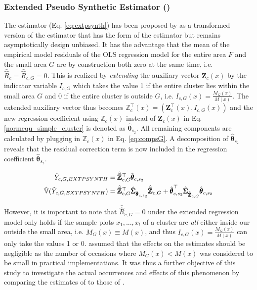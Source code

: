 \subsubsection{Extended Pseudo Synthetic Estimator (\extpsynth{})}

The \extpsynth{} estimator (Eq. \ref{eq:extpsynth}) has been proposed by \cite{mandallaz2013a} as a transformed version of the \psmall{} estimator that has the form of the \psynth{} estimator but remains asymptotically design unbiased. It has the advantage that the mean of the empirical model residuals of the OLS regression model for the entire area $F$ and the small area $G$ are by construction both zero at the same time, i.e. $\bar{\hat{R}}_{c} = \bar{\hat{R}}_{c,G} = 0$. This is realized by \textit{extending} the auxiliary vector $\pmb{Z}_{c}(x)$ by the indicator variable $I_{c,G}$ which takes the value 1 if the entire cluster lies within the small area $G$ and 0 if the entire cluster is outside $G$, i.e. $I_{c,G}(x)=\frac{M_{G}(x)}{M(x)}$. The extended auxiliary vector thus becomes $\pmb{\mathbb{Z}}_{c}^{\top}(x)= (\pmb{Z}_{c}^{\top}(x),I_{c,G}(x))$ and the new regression coefficient using $\pmb{\mathbb{Z}}_{c}(x)$ instead of $\pmb{Z}_{c}(x)$ in Eq. \ref{normequ_simple_cluster} is denoted as $\hat{\pmb{\theta}}_{s_2}$. All remaining components are calculated by plugging in $\pmb{\mathbb{Z}}_{c}(x)$ in Eq. \ref{eq:compsG}. A decomposition of $\hat{\pmb{\theta}}_{s_2}$ reveals that the residual correction term is now included in the regression coefficient $\hat{\pmb{\theta}}_{s_2}$.

\begin{subequations}\label{eq:extpsynth}
	\begin{align}
	\hat{Y}_{c,G,EXTPSYNTH} & =\hat{\bar{\pmb{\mathbb{Z}}}}_{c,G}^{\top}\hat{\pmb{\theta}}_{c,s_2} \label{eq:extpsynth_pest} \\
	\hat{\mathbb{V}}(\hat{Y}_{c,G,EXTPSYNTH})& =
	\hat{\bar{\pmb{\mathbb{Z}}}}_{c,G}^{\top}\hat{\pmb{\Sigma}}_{\hat{\pmb{\theta}}_{c,s_2}}
	\hat{\bar{\pmb{\mathbb{Z}}}}_{c,G}
	+ \hat{\pmb{\theta}}^{\top}_{c,s_2}\hat{\pmb{\Sigma}}_{\hat{\bar{\pmb{\mathbb{Z}}}}_{c,G}}\hat{\pmb{\theta}}_{c,s_2} \label{eq:extpsynth_var}
	\end{align}
\end{subequations}

However, it is important to note that $\bar{\hat{R}}_{c,G} = 0$ under the extended regression model only holds if the sample plots $x_1, ..., x_l$ of a cluster are \textit{all} either inside our outside the small area, i.e. $M_G(x)\equiv M(x)$, and thus $I_{c,G}(x)=\frac{M_{G}(x)}{M(x)}$ can only take the values 1 or 0. \citet{mandallaz2016} assumed that the effects on the estimates should be negligible as the number of occasions where $M_{G}(x) < M(x)$ was considered to be small in practical implementations. It was thus a further objective of this study to investigate the actual occurrences and effects of this phenomenon by comparing the estimates of \extpsynth{} to those of \psmall{}. %

